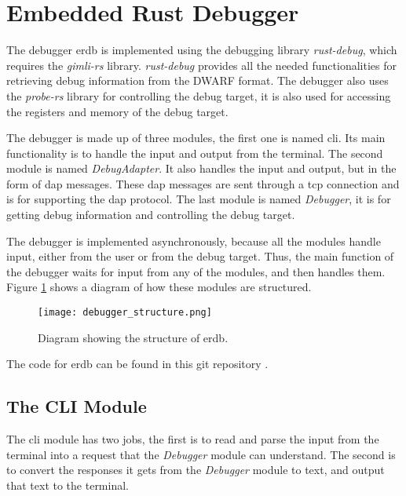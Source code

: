 \section{Embedded Rust Debugger}
The debugger \acrfull{erdb} is implemented using the debugging library \emph{rust-debug}, which requires the \emph{gimli-rs} library.
\emph{rust-debug} provides all the needed functionalities for retrieving debug information from the \gls{DWARF} format.
The debugger also uses the \emph{probe-rs} library for controlling the debug target, it is also used for accessing the registers and memory of the debug target.


The debugger is made up of three modules, the first one is named \acrshort{cli}.
Its main functionality is to handle the input and output from the terminal.
The second module is named \emph{DebugAdapter}.
It also handles the input and output, but in the form of \gls{dap} messages.
These \gls{dap} messages are sent through a \acrshort{tcp} connection and is for supporting the \gls{dap} protocol.
The last module is named \emph{Debugger}, it is for getting debug information and controlling the debug target.



The debugger is implemented asynchronously, because all the modules handle input, either from the user or from the debug target.
Thus, the main function of the debugger waits for input from any of the modules, and then handles them.
Figure \ref{fig:ERDStruct} shows a diagram of how these modules are structured.


\begin{figure}[h]
	\centering
	\texttt{[image: debugger\_structure.png]}
	\caption{Diagram showing the structure of \gls{erdb}.}
	\label{fig:ERDStruct}
\end{figure}


The code for \gls{erdb} can be found in this git repository \cite{erdb}.


\subsection{The CLI Module} 
The \acrshort{cli} module has two jobs, the first is to read and parse the input from the terminal into a request that the \emph{Debugger} module can understand.
The second is to convert the responses it gets from the \emph{Debugger} module to text, and output that text to the terminal.



